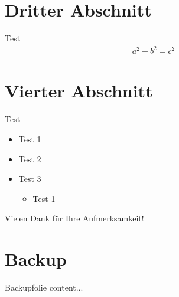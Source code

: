 \documentclass
[
german,
nosectionnum,
cdmath=false, cdfont=false, %
]{tudbeamer} %
\begin{document}
\section{Dritter Abschnitt}
\begin{frame}{Test}
	\begin{align*}
		a^2 + b^2 = c^2
	\end{align*}
\end{frame}



\section{Vierter Abschnitt}
\begin{frame}{Test}
	\begin{itemize}[label=\EnumerationSquare]
		\item Test 1
		\item Test 2
		\item Test 3
		\begin{itemize}[label=\EnumerationDash]
			\item Test 1
		\end{itemize}
	\end{itemize}
\end{frame}


\appendix
\begin{ClosingFrame}{}
	\Large\bfseries
	\begin{center}
		Vielen Dank für Ihre Aufmerksamkeit!
	\end{center} 
\end{ClosingFrame}


\section*{Backup}
\begin{BackupFrame}{Backupfolie}
	content...
\end{BackupFrame}

	
\end{document}
